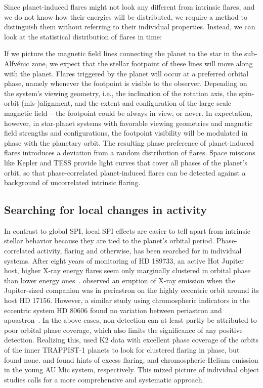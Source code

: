 \documentclass[twocolumn]{aastex631}
\begin{document}
Since planet-induced flares might not look any different from intrinsic flares, and we do not know how their energies will be distributed, we require a method to distinguish them without referring to their individual properties. Instead, we can look at the statistical distribution of flares in time: 

If we picture the magnetic field lines connecting the planet to the star in the sub-Alfv\'enic zone, we expect that the stellar footpoint of these lines will move along with the planet. Flares triggered by the planet will occur at a preferred orbital phase, namely whenever the footpoint is visible to the observer. Depending on the system's viewing geometry, i.e., the inclination of the rotation axis, the spin-orbit (mis-)alignment, and the extent and configuration of the large scale magnetic field -- the footpoint could be always in view, or never. In expectation, however, in star-planet systems with favorable viewing geometries and magnetic field strengths and configurations, the footpoint visibility will be modulated in phase with the planetary orbit. The resulting phase preference of planet-induced flares introduces a deviation from a random distribution of flares. Space missions like Kepler and TESS provide light curves that cover all phases of the planet's orbit, so that phase-correlated planet-induced flares can be detected against a background of uncorrelated intrinsic flaring. 

\subsection{Searching for local changes in activity}
\label{sec:intro:local}
In contrast to global SPI, local SPI effects are easier to tell apart from intrinsic stellar behavior because they are tied to the planet's orbital period. 
Phase-correlated activity, flaring and otherwise, has been searched for in individual systems. After eight years of monitoring of HD 189733, an active Hot Jupiter host, higher X-ray energy flares seem only marginally clustered in orbital phase than lower energy ones~\citep{pillitteri2022xray}. \citet{maggio2015coordinated} observed an eruption of X-ray emission when the Jupiter-sized companion was in periastron on the highly eccentric orbit around its host HD 17156. However, a similar study using chromospheric indicators in the eccentric system HD 80606 found no variation between periastron and apoastron~\citep{figueira2016activity}. In the above cases, non-detection can at least partly be attributed to poor orbital phase coverage, which also limits the significance of any positive detection. Realizing this, \citet{fischer2019timevariable} used K2 data with excellent phase coverage of the orbits of the inner \mbox{TRAPPIST-1} planets to look for clustered flaring in phase, but found none. \citet{ilin2022searching} and \citet{klein2022one} found hints of excess flaring, and chromospheric Helium emission in the young AU Mic system, respectively. This mixed picture of individual object studies calls for a more comprehensive and systematic approach.
\end{document}
